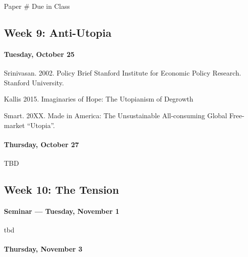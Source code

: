 Paper \# Due in Class

      \subsection{\textbf{Week 9:} Anti-Utopia}
      
\paragraph{Tuesday, October 25}
      
\begin{itemize*}
    \item Srinivasan. 2002. Policy Brief Stanford Institute for Economic Policy Research. Stanford University.
    \item Kallis 2015. Imaginaries of Hope: The Utopianism of Degrowth
    \item Smart. 20XX. Made in America: The Unsustainable All-consuming Global Free-market ``Utopia''.
\end{itemize*}
      
\paragraph{Thursday, October 27}
      
      \begin{itemize*}
      \item TBD
      \end{itemize*}
      
      \subsection{\textbf{Week 10:} The Tension}
      
      \paragraph{Seminar --- Tuesday, November 1}
      
      \begin{itemize*}
      \item tbd
      \end{itemize*}
    
      
\paragraph{Thursday, November 3}
      
